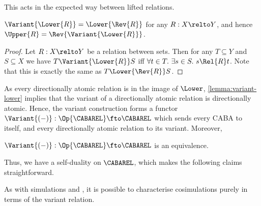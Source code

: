\documentclass[a4paper,UKenglish,cleveref, autoref]{lipics-v2021}
\begin{document}
This acts in the expected way between lifted relations.
\begin{lemma}
  \label{lemma:variant-lower}
  \(\Variant{\Lower{R}} = \Lower{\Rev{R}}\) for any \(R : X \relto Y\), and
  hence \(\Upper{R} = \Rev{\Variant{\Lower{R}}}\).
\end{lemma}
\begin{proof}
  Let \(R : X \relto Y\) be a relation between sets. Then for any
  \(T \subseteq Y\) and \(S \subseteq X\) we have \(T \Variant{\Lower{R}} S\)
  iff \(\forall t \in T.\ \exists s \in S.\ s \Rel{R} t\). Note that this is
  exactly the same as \(T \Lower{\Rev{R}} S\).
\end{proof}
As every directionally atomic relation is in the image of $\Lower$,
\cref{lemma:variant-lower} implies that the variant of a directionally atomic
relation is directionally atomic. Hence, the variant construction forms a
functor \(\Variant{(-)} : \Op{\CABAREL} \fto \CABAREL\) which sends every CABA
to itself, and every directionally atomic relation to its variant. Moreover,
\begin{theorem}
  \(\Variant{(-)} : \Op{\CABAREL} \fto \CABAREL\) is an equivalence.
\end{theorem}
Thus, we have a self-duality on $\CABAREL$, which makes the following
claims straightforward.

As with simulations and , it is possible to characterise
cosimulations purely in terms of the variant relation.
\end{document}
